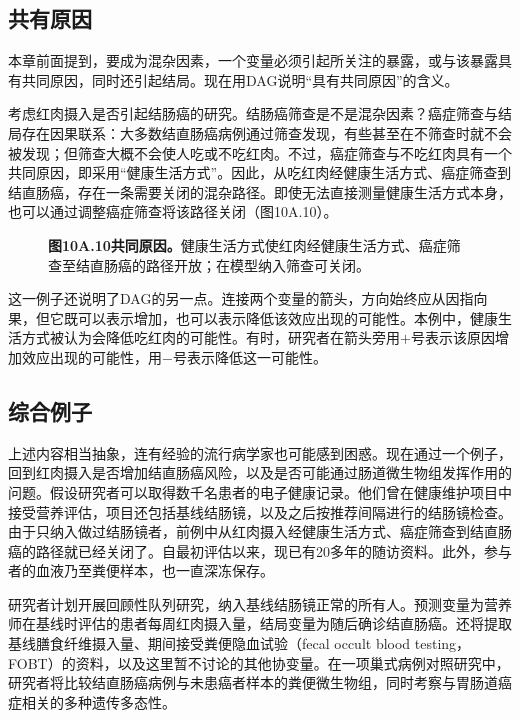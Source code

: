 \subsection{共有原因}
本章前面提到，要成为混杂因素，一个变量必须引起所关注的暴露，或与该暴露具有共同原因，同时还引起结局。现在用DAG说明“具有共同原因”的含义。

考虑红肉摄入是否引起结肠癌的研究。结肠癌筛查是不是混杂因素？癌症筛查与结局存在因果联系：大多数结直肠癌病例通过筛查发现，有些甚至在不筛查时就不会被发现；但筛查大概不会使人吃或不吃红肉。不过，癌症筛查与不吃红肉具有一个共同原因，即采用“健康生活方式”。因此，从吃红肉经健康生活方式、癌症筛查到结直肠癌，存在一条需要关闭的混杂路径。即使无法直接测量健康生活方式本身，也可以通过调整癌症筛查将该路径关闭（图10A.10）。
\par
\begin{figure}[htbp]\centering{}
\caption*{\textbf{图10A.10\quad 共同原因。}健康生活方式使红肉经健康生活方式、癌症筛查至结直肠癌的路径开放；在模型纳入筛查可关闭。}
\end{figure}
\par
这一例子还说明了DAG的另一点。连接两个变量的箭头，方向始终应从因指向果，但它既可以表示增加，也可以表示降低该效应出现的可能性。本例中，健康生活方式被认为会降低吃红肉的可能性。有时，研究者在箭头旁用$+$号表示该原因增加效应出现的可能性，用$-$号表示降低这一可能性。

\subsection{综合例子}
上述内容相当抽象，连有经验的流行病学家也可能感到困惑。现在通过一个例子，回到红肉摄入是否增加结直肠癌风险，以及是否可能通过肠道微生物组发挥作用的问题。假设研究者可以取得数千名患者的电子健康记录。他们曾在健康维护项目中接受营养评估，项目还包括基线结肠镜，以及之后按推荐间隔进行的结肠镜检查。由于只纳入做过结肠镜者，前例中从红肉摄入经健康生活方式、癌症筛查到结直肠癌的路径就已经关闭了。自最初评估以来，现已有20多年的随访资料。此外，参与者的血液乃至粪便样本，也一直深冻保存。

研究者计划开展回顾性队列研究，纳入基线结肠镜正常的所有人。预测变量为营养师在基线时评估的患者每周红肉摄入量，结局变量为随后确诊结直肠癌。还将提取基线膳食纤维摄入量、期间接受粪便隐血试验（fecal occult blood testing，FOBT）的资料，以及这里暂不讨论的其他协变量。在一项巢式病例对照研究中，研究者将比较结直肠癌病例与未患癌者样本的粪便微生物组，同时考察与胃肠道癌症相关的多种遗传多态性。

